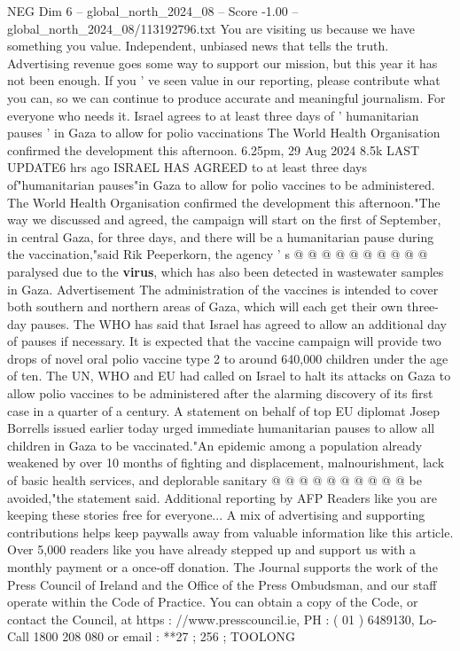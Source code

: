 \begin{textsample}{NEG Dim 6 – global\_north\_2024\_08 – Score -1.00 – global\_north\_2024\_08/113192796.txt}  \label{ex:f6_neg_071}
You are visiting us because we have something you value.
Independent, unbiased news that tells the truth.
Advertising revenue goes some way to support our mission, but this year it has not been enough.
If you ' ve seen value in our reporting, please contribute what you can, so we can continue to produce accurate and meaningful journalism.
For everyone who needs it.
Israel agrees to at least three days of ' humanitarian pauses ' in Gaza to allow for polio vaccinations The World Health Organisation confirmed the development this afternoon. 6.25pm, 29 Aug 2024 8.5k LAST UPDATE6 hrs ago ISRAEL HAS AGREED to at least three days of"humanitarian pauses"in Gaza to allow for polio vaccines to be administered.
The World Health Organisation confirmed the development this afternoon."The way we discussed and agreed, the campaign will start on the first of September, in central Gaza, for three days, and there will be a humanitarian pause during the vaccination,"said Rik Peeperkorn, the agency ' s @ @ @ @ @ @ @ @ @ @ paralysed due to the \textbf{virus}, which has also been detected in wastewater samples in Gaza.
Advertisement The administration of the vaccines is intended to cover both southern and northern areas of Gaza, which will each get their own three-day pauses.
The WHO has said that Israel has agreed to allow an additional day of pauses if necessary.
It is expected that the vaccine campaign will provide two drops of novel oral polio vaccine type 2 to around 640,000 children under the age of ten.
The UN, WHO and EU had called on Israel to halt its attacks on Gaza to allow polio vaccines to be administered after the alarming discovery of its first case in a quarter of a century.
A statement on behalf of top EU diplomat Josep Borrells issued earlier today urged immediate humanitarian pauses to allow all children in Gaza to be vaccinated."An epidemic among a population already weakened by over 10 months of fighting and displacement, malnourishment, lack of basic health services, and deplorable sanitary @ @ @ @ @ @ @ @ @ @ be avoided,"the statement said.
Additional reporting by AFP Readers like you are keeping these stories free for everyone...
A mix of advertising and supporting contributions helps keep paywalls away from valuable information like this article.
Over 5,000 readers like you have already stepped up and support us with a monthly payment or a once-off donation.
The Journal supports the work of the Press Council of Ireland and the Office of the Press Ombudsman, and our staff operate within the Code of Practice.
You can obtain a copy of the Code, or contact the Council, at https : //www.presscouncil.ie, PH : ( 01 ) 6489130, Lo-Call 1800 208 080 or email : **27 ; 256 ; TOOLONG

\end{textsample}
